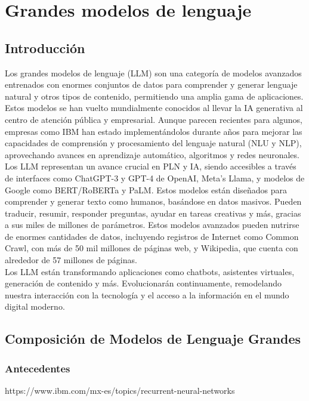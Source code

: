 \usepackage{graphicx}
\usepackage{float}
\chapter{Grandes modelos de lenguaje}


\section{Introducción}
Los grandes modelos de lenguaje (LLM) son una categoría de modelos avanzados entrenados con enormes conjuntos de datos para comprender y generar lenguaje natural y otros tipos de contenido, permitiendo una amplia gama de aplicaciones.\\

Estos modelos se han vuelto mundialmente conocidos al llevar la IA generativa al centro de atención pública y empresarial. Aunque parecen recientes para algunos, empresas como IBM han estado implementándolos durante años para mejorar las capacidades de comprensión y procesamiento del lenguaje natural (NLU y NLP), aprovechando avances en aprendizaje automático, algoritmos y redes neuronales.\\

Los LLM representan un avance crucial en PLN y IA, siendo accesibles a través de interfaces como ChatGPT-3 y GPT-4 de OpenAI, Meta's Llama, y modelos de Google como BERT/RoBERTa y PaLM.  Estos modelos están diseñados para comprender y generar texto como humanos, basándose en datos masivos. Pueden traducir, resumir, responder preguntas, ayudar en tareas creativas y más, gracias a sus miles de millones de parámetros. Estos modelos avanzados pueden nutrirse de enormes cantidades de datos, incluyendo registros de Internet como Common Crawl, con más de 50 mil millones de páginas web, y Wikipedia, que cuenta con alrededor de 57 millones de páginas.\\

Los LLM están transformando aplicaciones como chatbots, asistentes virtuales, generación de contenido y más. Evolucionarán continuamente, remodelando nuestra interacción con la tecnología y el acceso a la información en el mundo digital moderno.


\section{Composición de Modelos de Lenguaje Grandes}

\subsection{Antecedentes}
https://www.ibm.com/mx-es/topics/recurrent-neural-networks

